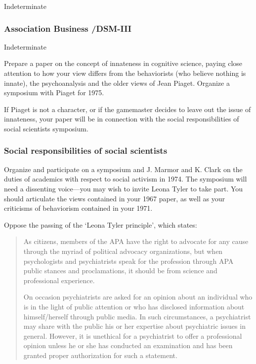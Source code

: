 \begin{refsection}
Indeterminate

\subsubsection{Association Business \slash  DSM-III}
\label{associationbusinessdsm-iii}

Indeterminate

\begin{writingtask}[Chomsky]\label{writingtask:chomsky}
Prepare a paper on the concept of innateness in cognitive science, paying close attention to how your view differs from the behaviorists (who believe nothing is innate), the psychoanalysis and the older views of Jean Piaget. Organize a symposium with Piaget for 1975.
\end{writingtask}

\begin{writingtask}[Chomsky]\label{writingtask:chomskyB}
If Piaget is not a character, or if the gamemaster decides to leave out the issue of innateness, your paper will be in connection with the social responsibilities of social scientists symposium.
\end{writingtask}

\subsubsection{Social responsibilities of social scientists}
\label{socialresponsibilitiesofsocialscientists}

Organize and participate on a symposium and J. Marmor and K. Clark on the duties of academics with respect to social activism in 1974. The symposium will need a dissenting voice---you may wish to invite Leona Tyler to take part. You should articulate the views contained in your 1967 paper, as well as your criticisms of behaviorism contained in your 1971.

Oppose the passing of the `Leona Tyler principle', which states:

\begin{quote}

As citizens, members of the APA have the right to advocate for any cause through the myriad of political advocacy organizations, but when psychologists and psychiatrists speak for the profession through APA public stances and proclamations, it should be from science and professional experience.

On occasion psychiatrists are asked for an opinion about an individual who is in the light of public attention or who has disclosed information about himself\slash herself through public media. In such circumstances, a psychiatrist may share with the public his or her expertise about psychiatric issues in general. However, it is unethical for a psychiatrist to offer a professional opinion unless he or she has conducted an examination and has been granted proper authorization for such a statement.
\end{quote}


\end{refsection}
